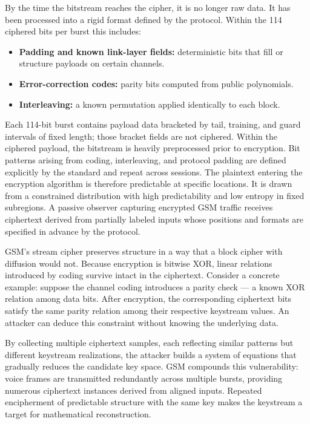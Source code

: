 By the time the bitstream reaches the cipher, it is no longer raw data. It has been processed into a rigid format defined by the protocol. Within the 114 ciphered bits per burst this includes:

\begin{itemize}
  \item \textbf{Padding and known link-layer fields:} deterministic bits that fill or structure payloads on certain channels.
  \item \textbf{Error-correction codes:} parity bits computed from public polynomials.
  \item \textbf{Interleaving:} a known permutation applied identically to each block.
\end{itemize}

Each 114-bit burst contains payload data bracketed by tail, training, and guard intervals of fixed length; those bracket fields are not ciphered. Within the ciphered payload, the bitstream is heavily preprocessed prior to encryption. Bit patterns arising from coding, interleaving, and protocol padding are defined explicitly by the standard and repeat across sessions. The plaintext entering the encryption algorithm is therefore predictable at specific locations. It is drawn from a constrained distribution with high predictability and low entropy in fixed subregions. A passive observer capturing encrypted GSM traffic receives ciphertext derived from partially labeled inputs whose positions and formats are specified in advance by the protocol.

GSM's stream cipher preserves structure in a way that a block cipher with diffusion would not. Because encryption is bitwise XOR, linear relations introduced by coding survive intact in the ciphertext. Consider a concrete example: suppose the channel coding introduces a parity check — a known XOR relation among data bits. After encryption, the corresponding ciphertext bits satisfy the same parity relation among their respective keystream values. An attacker can deduce this constraint without knowing the underlying data.

By collecting multiple ciphertext samples, each reflecting similar patterns but different keystream realizations, the attacker builds a system of equations that gradually reduces the candidate key space. GSM compounds this vulnerability: voice frames are transmitted redundantly across multiple bursts, providing numerous ciphertext instances derived from aligned inputs. Repeated encipherment of predictable structure with the same key makes the keystream a target for mathematical reconstruction.

